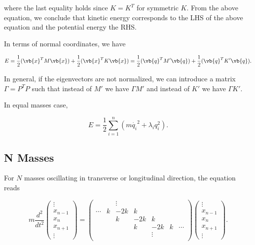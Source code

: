 \documentclass[a4paper,12pt]{report}
\begin{document}
where the last equality holds since \(K=K^T\) for symmetric \(K\). From the above equation, we conclude that kinetic energy corresponds to the LHS of the above equation and the potential energy the RHS.

In terms of normal coordinates, we have

\begin{equation}
    E = \frac{1}{2} (\vb{x} ^TM\vb{x}) + \frac{1}{2} (\vb{x} ^TK\vb{x}) =  \frac{1}{2}(\vb{q} ^TM'\vb{q} )+\frac{1}{2}(\vb{q} ^TK'\vb{q} ).
\end{equation}

In general, if the eigenvectors are not normalized, we can introduce a matrix \(\Gamma = P^TP\) such that instead of \(M'\) we have \(\Gamma M'\) and instead of \(K'\) we have \(\Gamma K'\).     

In equal masses case, 

\begin{equation}
    E = \frac{1}{2} \sum_{i=1}^{n} \left(  m \dot{q_{i} }^2+\lambda _{i}q_{i}^2     \right).
\end{equation}



\subsection{N Masses}

For \(N\) masses oscillating in transverse or longitudinal direction, the equation reads 

\begin{equation}
	m \frac{d^2}{dt^2} 
\begin{pmatrix}
\vdots \\
x_{n-1} \\
x_n \\
x_{n+1} \\
\vdots
\end{pmatrix}
=
\begin{pmatrix}
	 &  & \vdots  &  &  &  &   \\
	\cdots  & k & -2k & k &  &  &   \\
	 &  & k & -2k & k &  &   \\
	 &  &  & k & -2k & k &  \cdots  \\
	 &  &  &  & \vdots  &  &   \\
\end{pmatrix}
\begin{pmatrix}
\vdots \\
x_{n-1} \\
x_n \\
x_{n+1} \\
\vdots
\end{pmatrix}.
\end{equation}
\end{document}
